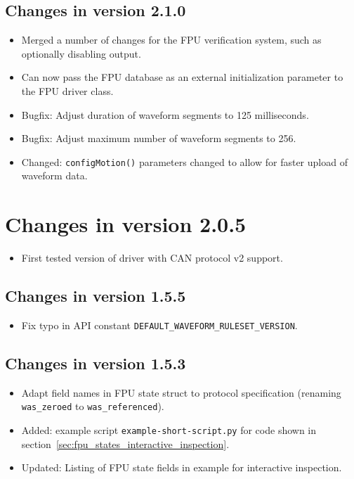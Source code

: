 \documentclass[fontsize=12,a4paper]{scrreprt}
\begin{document}
\subsection*{Changes in version 2.1.0}
\begin{itemize}
\item Merged a number of changes for the FPU verification system,
  such as optionally disabling output.
\item Can now pass the FPU database as an external initialization
  parameter to the FPU driver class.
\item Bugfix: Adjust duration of waveform segments to 125 milliseconds.
\item Bugfix: Adjust maximum number of waveform segments to 256.
\item Changed: \texttt{configMotion()} parameters changed to allow for
  faster upload of waveform data.
\end{itemize}


\section*{Changes in version 2.0.5}
\begin{itemize}
\item First tested version of driver with CAN protocol v2 support.
\end{itemize}

\subsection*{Changes in version 1.5.5}
\begin{itemize}
\item Fix typo in API constant \texttt{DEFAULT\_WAVEFORM\_RULESET\_VERSION}.
\end{itemize}

\subsection*{Changes in version 1.5.3}

\begin{itemize}
\item Adapt field names in FPU state struct to protocol specification
  (renaming \texttt{was\_zeroed} to \texttt{was\_referenced}).
\item Added: example script \texttt{example-short-script.py} for code shown in
  section~\ref{sec:fpu_states_interactive_inspection}.
\item Updated: Listing of FPU state fields in example for interactive inspection.
\end{itemize}
\end{document}
